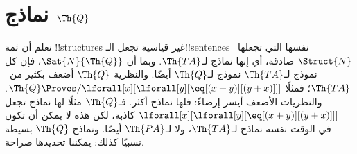 \documentclass[../../../include/open-logic-section]{subfiles}
\begin{document}
\section{نماذج $\Th{Q}$}

\begin{explain}
نعلم أن ثمة !!{structure}s غير قياسية تجعل الـ!!{sentence}s نفسها التي
تجعلها~$\Struct{N}$ صادقة، أي إنها نماذج لـ$\Th{TA}$. وبما أن
$\Sat{N}{\Th{Q}}$، فإن كل نموذج لـ$\Th{TA}$ نموذج لـ$\Th{Q}$ أيضًا.
والنظرية $\Th{Q}$ أضعف بكثير من~$\Th{TA}$؛ فمثلًا
$\Th{Q} \Proves/ \lforall[x][\lforall[y][\eq[(x + y)][(y+x)]]]$.
والنظريات الأضعف أيسر إرضاءً: فلها نماذج أكثر. فـ$\Th{Q}$ مثلًا لها
نماذج تجعل $\lforall[x][\lforall[y][\eq[(x + y)][(y+x)]]]$ كاذبة، لكن
هذه لا يمكن أن تكون في الوقت نفسه نماذج لـ$\Th{TA}$، ولا لـ$\Th{PA}$
أيضًا. ونماذج $\Th{Q}$ بسيطة نسبيًا كذلك: يمكننا تحديدها صراحة.
\end{explain}
\end{document}
